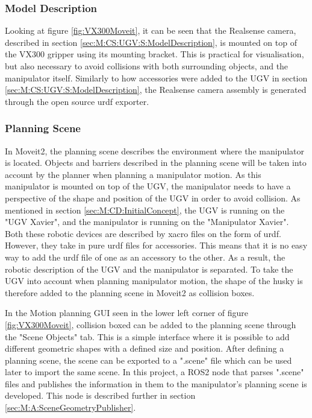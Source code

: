 \subsubsection{Model Description}
Looking at figure \ref{fig:VX300Moveit}, it can be seen that the Realsense camera, described in section \ref{sec:M:CS:UGV:S:ModelDescription}, is mounted on top of the VX300 gripper using its mounting bracket. This is practical for visualisation, but also necessary to avoid collisions with both surrounding objects, and the manipulator itself. Similarly to how accessories were added to the UGV in section \ref{sec:M:CS:UGV:S:ModelDescription}, the Realsense camera assembly is generated through the open source urdf exporter\cite{urdf_exporter}. 

\subsubsection{Planning Scene}
In Moveit2, the planning scene describes the environment where the manipulator is located. Objects and barriers described in the planning scene will be taken into account by the planner when planning a manipulator motion. As this manipulator is mounted on top of the UGV, the manipulator needs to have a perspective of the shape and position of the UGV in order to avoid collision. As mentioned in section \ref{sec:M:CD:InitialConcept}, the UGV is running on the "UGV Xavier", and the manipulator is running on the "Manipulator Xavier". Both these robotic devices are described by xacro files on the form of urdf. However, they take in pure urdf files for accessories. This means that it is no easy way to add the urdf file of one as an accessory to the other. As a result, the robotic description of the UGV and the manipulator is separated. To take the UGV into account when planning manipulator motion, the shape of the husky is therefore added to the planning scene in Moveit2 as collision boxes.

In the Motion planning GUI seen in the lower left corner of figure \ref{fig:VX300Moveit}, collision boxed can be added to the planning scene through the "Scene Objects" tab. This is a simple interface where it is possible to add different geometric shapes with a defined size and position. After defining a planning scene, the scene can be exported to a ".scene" file which can be used later to import the same scene. In this project, a ROS2 node that parses ".scene" files and publishes the information in them to the manipulator's planning scene is developed. This node is described further in section \ref{sec:M:A:SceneGeometryPublisher}.


